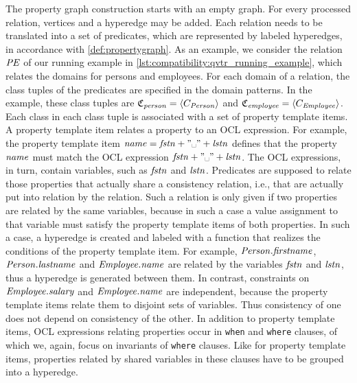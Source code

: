 The property graph construction starts with an empty graph.
For every processed \qvtr relation, vertices and a hyperedge may be added.
Each \qvtr relation needs to be translated into a set of predicates, which are represented by labeled hyperedges, in accordance with \autoref{def:propertygraph}.
As an example, we consider the relation $\mathit{PE}$ of our running example in \autoref{lst:compatibility:qvtr_running_example}, which relates the domains for persons and employees.
For each domain of a relation, the class tuples of the predicates are specified in the domain patterns.
In the example, these class tuples are $\classtuple{C}{\mathvariable{person}} = \tupled{\class{C}{\mathvariable{Person}}}$ and $\classtuple{C}{\mathvariable{employee}} = \tupled{\class{C}{\mathvariable{Employee}}}$.
Each class in each class tuple is associated with a set of property template items.
A property template item relates a property to an \gls{OCL} expression. 
For example, the property template item $\mathvariable{name} = \mathvariable{fstn} + "\text{\textvisiblespace}" + \mathvariable{lstn}$ defines that the property $\mathit{name}$ must match the \gls{OCL} expression $\mathvariable{fstn} + "\text{\textvisiblespace}" + \mathvariable{lstn}$.
The \gls{OCL} expressions, in turn, contain \qvtr variables, such as $\mathit{fstn}$ and $\mathit{lstn}$.
Predicates are supposed to relate those properties that actually share a consistency relation, i.e., that are actually put into relation by the \qvtr relation.
Such a relation is only given if two properties are related by the same \qvtr variables, because in such a case a value assignment to that variable must satisfy the property template items of both properties.
In such a case, a hyperedge is created and labeled with a function that realizes the conditions of the property template item.
For example, $\mathit{Person.firstname}$, $\mathit{Person.lastname}$ and $\mathit{Employee.name}$ are related by the \qvtr variables $\mathit{fstn}$ and $\mathit{lstn}$, thus a hyperedge is generated between them.
In contrast, constraints on $\mathit{Employee.salary}$ and $\mathit{Employee.name}$ are independent, because the property template items relate them to disjoint sets of \qvtr variables. 
Thus consistency of one does not depend on consistency of the other.
In addition to property template items, \gls{OCL} expressions relating properties occur in \texttt{when} and \texttt{where} clauses, of which we, again, focus on invariants of \texttt{where} clauses.
Like for property template items, properties related by shared \qvtr variables in these clauses have to be grouped into a hyperedge.

